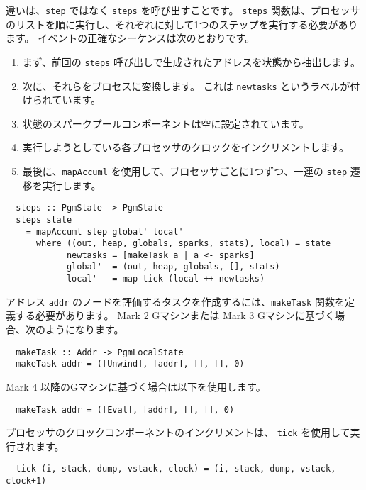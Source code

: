 \documentclass{jarticle}
\begin{document}
違いは、\texttt{step} ではなく \texttt{steps} を呼び出すことです。
\texttt{steps} 関数は、プロセッサのリストを順に実行し、それぞれに対して1つのステップを実行する必要があります。
イベントの正確なシーケンスは次のとおりです。

\begin{enumerate}
	\item まず、前回の \texttt{steps} 呼び出しで生成されたアドレスを状態から抽出します。
	\item 次に、それらをプロセスに変換します。
	      これは \texttt{newtasks} というラベルが付けられています。
	\item 状態のスパークプールコンポーネントは空に設定されています。
	\item 実行しようとしている各プロセッサのクロックをインクリメントします。
	\item 最後に、\texttt{mapAccuml} を使用して、プロセッサごとに1つずつ、一連の \texttt{step} 遷移を実行します。
\end{enumerate}

\begin{verbatim}
  steps :: PgmState -> PgmState
  steps state
    = mapAccuml step global' local'
      where ((out, heap, globals, sparks, stats), local) = state
            newtasks = [makeTask a | a <- sparks]
            global'  = (out, heap, globals, [], stats)
            local'   = map tick (local ++ newtasks)
\end{verbatim}

アドレス \texttt{addr} のノードを評価するタスクを作成するには、\texttt{makeTask} 関数を定義する必要があります。
Mark 2 Gマシンまたは Mark 3 Gマシンに基づく場合、次のようになります。

\begin{verbatim}
  makeTask :: Addr -> PgmLocalState
  makeTask addr = ([Unwind], [addr], [], [], 0)
\end{verbatim}

Mark 4 以降のGマシンに基づく場合は以下を使用します。

\begin{verbatim}
  makeTask addr = ([Eval], [addr], [], [], 0)
\end{verbatim}

プロセッサのクロックコンポーネントのインクリメントは、 \texttt{tick} を使用して実行されます。

\begin{verbatim}
  tick (i, stack, dump, vstack, clock) = (i, stack, dump, vstack, clock+1)
\end{verbatim}
\end{document}
